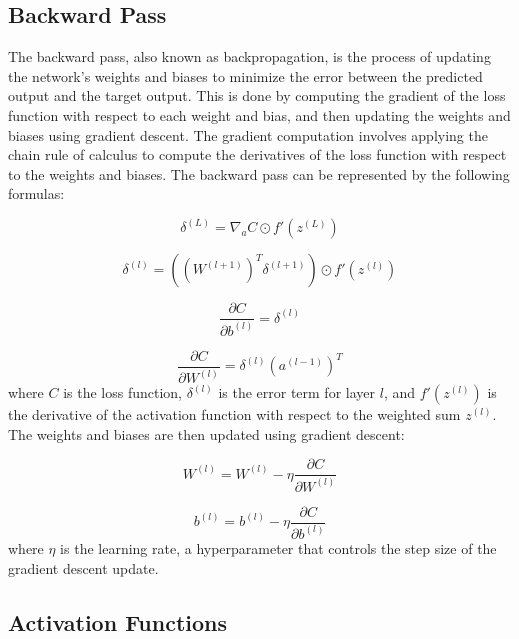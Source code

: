 \documentclass[12pt]{article}
\begin{document}
\subsection{Backward Pass}
The backward pass, also known as backpropagation, is the process of updating the network's weights and biases to minimize the error between the predicted output and the target output. This is done by computing the gradient of the loss function with respect to each weight and bias, and then updating the weights and biases using gradient descent. The gradient computation involves applying the chain rule of calculus to compute the derivatives of the loss function with respect to the weights and biases. The backward pass can be represented by the following formulas:

\begin{equation}
\delta^{(L)} = \nabla_a C \odot f'(z^{(L)})
\end{equation}

\begin{equation}
\delta^{(l)} = ((W^{(l+1)})^T \delta^{(l+1)}) \odot f'(z^{(l)})
\end{equation}

\begin{equation}
\frac{\partial C}{\partial b^{(l)}} = \delta^{(l)}
\end{equation}

\begin{equation}
\frac{\partial C}{\partial W^{(l)}} = \delta^{(l)} (a^{(l-1)})^T
\end{equation}
where $C$ is the loss function, $\delta^{(l)}$ is the error term for layer $l$, and $f'(z^{(l)})$ is the derivative of the activation function with respect to the weighted sum $z^{(l)}$. The weights and biases are then updated using gradient descent:

\begin{equation}
W^{(l)} = W^{(l)} - \eta \frac{\partial C}{\partial W^{(l)}}
\end{equation}

\begin{equation}
b^{(l)} = b^{(l)} - \eta \frac{\partial C}{\partial b^{(l)}}
\end{equation}
where $\eta$ is the learning rate, a hyperparameter that controls the step size of the gradient descent update.

\subsection{Activation Functions}
\end{document}
